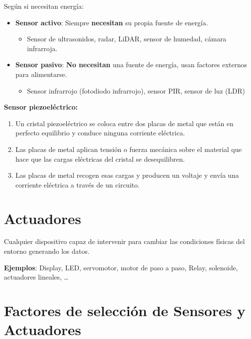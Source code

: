 \documentclass[12pt]{report} %
\begin{document}
Según si necesitan energía:

\begin{itemize}

\item
  \textbf{Sensor activo}: Siempre \textbf{necesitan} su propia fuente de
  energía.

  \begin{itemize}
  
  \item
    Sensor de ultrasonidos, radar, LiDAR, sensor de humedad, cámara
    infrarroja.
  \end{itemize}
\item
  \textbf{Sensor pasivo}: \textbf{No necesitan} una fuente de energía,
  usan factores externos para alimentarse.

  \begin{itemize}
  
  \item
    Sensor infrarrojo (fotodiodo infrarrojo), sensor PIR, sensor de luz
    (LDR)
  \end{itemize}
\end{itemize}

\textbf{Sensor piezoeléctrico:}

\begin{enumerate}
\def\labelenumi{\arabic{enumi}.}

\item
  Un cristal piezoeléctrico se coloca entre dos placas de metal que
  están en perfecto equilibrio y conduce ninguna corriente eléctrica.
\item
  Las placas de metal aplican tensión o fuerza mecánica sobre el
  material que hace que las cargas eléctricas del cristal se
  desequilibren.
\item
  Las placas de metal recogen esas cargas y producen un voltaje y envía
  una corriente eléctrica a través de un circuito.
\end{enumerate}

\section{Actuadores}

Cualquier dispositivo capaz de intervenir para cambiar las condiciones
físicas del entorno generando los datos.

\textbf{Ejemplos}: Display, LED, servomotor, motor de paso a paso,
Relay, solenoide, actuadores lineales, \ldots{}

\section{Factores de selección de Sensores y
Actuadores}
\end{document}

